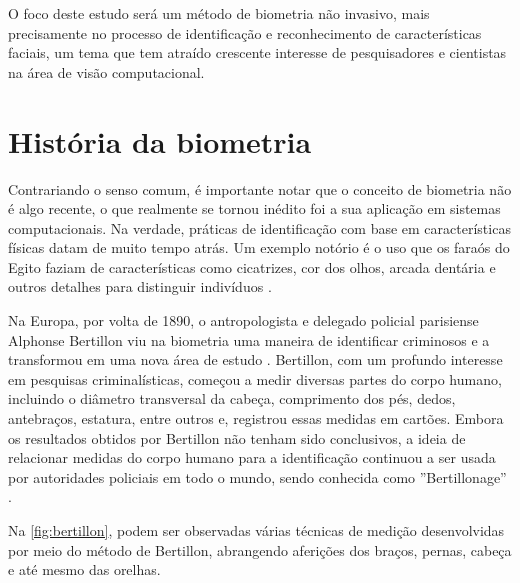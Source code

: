 O foco deste estudo será um método de biometria não invasivo, mais 
precisamente no processo de identificação e reconhecimento de 
características faciais, um tema que tem atraído crescente 
interesse de pesquisadores e cientistas na área de visão 
computacional.

\section{História da biometria}\label{sec:histbiometria}

Contrariando o senso comum, é importante notar que o conceito de biometria 
não é algo recente, o que realmente se tornou inédito foi a sua aplicação 
em sistemas computacionais. Na verdade, práticas de identificação com base 
em características físicas datam de muito tempo atrás. Um exemplo notório 
é o uso que os faraós do Egito faziam de características como cicatrizes, 
cor dos olhos, arcada dentária e outros detalhes para distinguir 
indivíduos \cite{boechat2008}.

Na Europa, por volta de 1890, o antropologista e delegado policial 
parisiense Alphonse Bertillon viu na biometria uma maneira de identificar 
criminosos e a transformou em uma nova área de estudo \cite{moraes2006}. 
Bertillon, com um profundo interesse em pesquisas criminalísticas, 
começou a medir diversas partes do corpo humano, incluindo o diâmetro 
transversal da cabeça, comprimento dos pés, dedos, antebraços, estatura, 
entre outros e, registrou essas medidas em cartões. Embora os resultados 
obtidos por Bertillon não tenham sido conclusivos, a ideia de relacionar 
medidas do corpo humano para a identificação continuou a ser usada 
por autoridades policiais em todo o mundo, sendo conhecida como 
''Bertillonage'' \cite{boechat2008}.

Na \autoref{fig:bertillon}, podem ser observadas várias técnicas de medição 
desenvolvidas por meio do método de Bertillon, abrangendo aferições dos 
braços, pernas, cabeça e até mesmo das orelhas.

